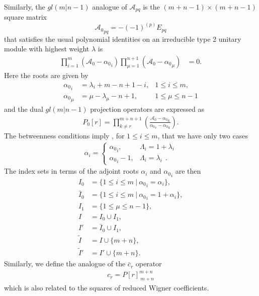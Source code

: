 \documentclass[12pt]{article}
\def\nn{\nonumber}
\begin{document}
Similarly, the $gl(m|n-1)$ analogue of ${\mathcal{A}}_{pq}$ is the $(m+n-1) \times (m+n-1)$ square matrix
$$
{\mathcal{A}_0}_{pq} = -(-1)^{(p)} E_{pq}
$$
that satisfies the usual polynomial identities on an irreducible type 2 unitary module with highest weight $\lambda$ is
\begin{align*}
	\prod^m_{i=1} (\mathcal{A}_0 - {\alpha_0}_i ) \prod^{n+1}_{\mu=1} (\mathcal{A}_0 - {\alpha_0}_\mu) &= 0 .
\end{align*}
Here the roots are given by
\begin{align*}
{\alpha_0}_i &= {\lambda}_i + m - n + 1 - i, &1\leq i\leq m, \\
{\alpha_0}_\mu &= \mu-{\lambda}_\mu - n + 1, &1\leq \mu \leq n - 1 
\end{align*}
and the dual $gl(m|n-1)$ projection operators are expressed as
\begin{align}
P_0[r] = \prod_{k\neq r}^{m+n+1}\left( 
\frac{\mathcal{A}_0-{\alpha_0}_k}
{{\alpha_0}_r-{\alpha_0}_k} \right).
\end{align}
The betweenness conditions imply 
\cite{GIW3}, for $1\leq i\leq m$, that we have only two cases
\begin{align}
\alpha_i = \left\{ \begin{array}{rl} {\alpha_0}_i,& \Lambda_i = 1+\lambda_i\\
                                    {\alpha_0}_i - 1,& \Lambda_i = \lambda_i  ~~.
\end{array} \right.
\nn
\end{align}
The index sets in terms of the adjoint roots $\alpha_i$ and ${\alpha_0}_i$ are then
\begin{align}
I_0 &=  \{ 1\leq i\leq m\ |\ {\alpha_0}_i=\alpha_i\},\nn\\
\bar{I}_0 &=  \{ 1\leq i\leq m\ |\ {\alpha_0}_i=1+\alpha_i\},\nn\\
I_1 &= \{ 1\leq\mu\leq n-1\},\nn\\
I &= I_0\cup I_1,\nn\\
I'&= \bar{I}_0\cup I_1,\nn\\
\tilde{I} &= I\cup \{m+n\},\nn\\
\tilde{I}' &= I'\cup \{m+n\}.
\label{DefIndexSets2} 
\end{align}
Similarly, we define the analogue of the $\bar{c}_r$ operator 
\begin{align*}
c_r = P[r]_{\ m+n}^{m+n}
\end{align*}
which is also related to the squares of reduced Wigner coefficients.
\end{document}
